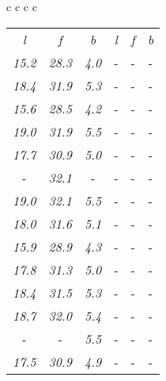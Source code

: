 \documentclass[sigplan,screen]{acmart}
\makeatletter
\newcommand{\ccell}[3][]{%
  \kern-\fboxsep
  \if\relax\detokenize{#1}\relax
    \expandafter\@firstoftwo
  \else
    \expandafter\@secondoftwo
  \fi
  {\colorbox{#2}}%
  {\colorbox[#1]{#2}}%
  {#3}\kern-\fboxsep
}
\makeatother
\begin{document}
\begin{table*}
\begin{tabular}{c c c c}
\begin{tabular}{c c c c c c}
   \hline
  \textit{l} & \textit{f} & \textit{b} & \textit{l} & \textit{f} & \textit{b} \\
      \textit{15.2} & \textit{28.3} & \textit{4.0} &  \ccell[gray]{0.9}{\textit{2.7}} &  \ccell[gray]{0.9}{\textit{5.8}} &  \ccell[gray]{0.9}{\textit{0.6}} \\
      \textit{18.4} & \textit{31.9} & \textit{5.3} &  \ccell[gray]{0.9}{\textit{2.7}} &  \ccell[gray]{0.9}{\textit{5.8}} &  \ccell[gray]{0.9}{\textit{0.6}} \\
      \textit{15.6} & \textit{28.5} & \textit{4.2} &  \ccell[gray]{0.9}{\textit{2.7}} &  \ccell[gray]{0.9}{\textit{5.8}} &  \ccell[gray]{0.9}{\textit{0.6}} \\
      \textit{19.0} & \textit{31.9} & \textit{5.5} &  \ccell[gray]{0.9}{\textit{2.7}} &  \ccell[gray]{0.9}{\textit{5.8}} &  \ccell[gray]{0.9}{\textit{0.6}} \\
      \textit{17.7} & \textit{30.9} & \textit{5.0} &  \ccell[gray]{0.9}{\textit{2.7}} &  \ccell[gray]{0.9}{\textit{5.8}} &  \ccell[gray]{0.9}{\textit{0.6}} \\
       \ccell[gray]{0.9}{\textit{19.1}} & \textit{32.1} &  \ccell[gray]{0.9}{\textit{5.6}} &  \ccell[gray]{0.9}{\textit{2.7}} &  \ccell[gray]{0.9}{\textit{5.8}} &  \ccell[gray]{0.9}{\textit{0.6}} \\
      \textit{19.0} & \textit{32.1} & \textit{5.5} &  \ccell[gray]{0.9}{\textit{2.7}} &  \ccell[gray]{0.9}{\textit{5.8}} &  \ccell[gray]{0.9}{\textit{0.6}} \\
      \textit{18.0} & \textit{31.6} & \textit{5.1} &  \ccell[gray]{0.9}{\textit{2.7}} &  \ccell[gray]{0.9}{\textit{5.8}} &  \ccell[gray]{0.9}{\textit{0.6}} \\
      \textit{15.9} & \textit{28.9} & \textit{4.3} &  \ccell[gray]{0.9}{\textit{2.7}} &  \ccell[gray]{0.9}{\textit{5.8}} &  \ccell[gray]{0.9}{\textit{0.6}} \\
      \textit{17.8} & \textit{31.3} & \textit{5.0} &  \ccell[gray]{0.9}{\textit{2.7}} &  \ccell[gray]{0.9}{\textit{5.8}} &  \ccell[gray]{0.9}{\textit{0.6}} \\
      \textit{18.4} & \textit{31.5} & \textit{5.3} &  \ccell[gray]{0.9}{\textit{2.7}} &  \ccell[gray]{0.9}{\textit{5.8}} &  \ccell[gray]{0.9}{\textit{0.6}} \\
      \textit{18.7} & \textit{32.0} & \textit{5.4} &  \ccell[gray]{0.9}{\textit{2.7}} &  \ccell[gray]{0.9}{\textit{5.8}} &  \ccell[gray]{0.9}{\textit{0.6}} \\
       \ccell[gray]{0.9}{\textit{19.1}} &  \ccell[gray]{0.9}{\textit{32.4}} & \textit{5.5} &  \ccell[gray]{0.9}{\textit{2.7}} &  \ccell[gray]{0.9}{\textit{5.8}} &  \ccell[gray]{0.9}{\textit{0.6}} \\
      \textit{17.5} & \textit{30.9} & \textit{4.9} &  \ccell[gray]{0.9}{\textit{2.7}} &  \ccell[gray]{0.9}{\textit{5.8}} &  \ccell[gray]{0.9}{\textit{0.6}} \\
      

\end{tabular}
\end{tabular}
\end{table*}
\end{document}
